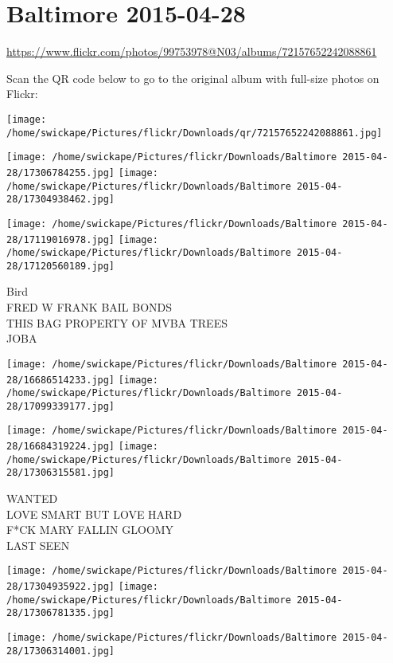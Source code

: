 \documentclass[10pt,letterpaper]{article}
\title{}
\author{}
\date{}
\begin{document}
\section*{Baltimore 2015-04-28}

\url{https://www.flickr.com/photos/99753978@N03/albums/72157652242088861}

Scan the QR code below to go to the original album with full-size photos on Flickr:

\texttt{[image: /home/swickape/Pictures/flickr/Downloads/qr/72157652242088861.jpg]}
\pagebreak

\texttt{[image: /home/swickape/Pictures/flickr/Downloads/Baltimore 2015-04-28/17306784255.jpg]}
\texttt{[image: /home/swickape/Pictures/flickr/Downloads/Baltimore 2015-04-28/17304938462.jpg]}

\texttt{[image: /home/swickape/Pictures/flickr/Downloads/Baltimore 2015-04-28/17119016978.jpg]}
\texttt{[image: /home/swickape/Pictures/flickr/Downloads/Baltimore 2015-04-28/17120560189.jpg]}

Bird\\
FRED W FRANK BAIL BONDS\\
THIS BAG PROPERTY OF MVBA TREES\\
JOBA
\pagebreak

\texttt{[image: /home/swickape/Pictures/flickr/Downloads/Baltimore 2015-04-28/16686514233.jpg]}
\texttt{[image: /home/swickape/Pictures/flickr/Downloads/Baltimore 2015-04-28/17099339177.jpg]}

\texttt{[image: /home/swickape/Pictures/flickr/Downloads/Baltimore 2015-04-28/16684319224.jpg]}
\texttt{[image: /home/swickape/Pictures/flickr/Downloads/Baltimore 2015-04-28/17306315581.jpg]}

WANTED\\
LOVE SMART BUT LOVE HARD\\
F*CK MARY FALLIN GLOOMY\\
LAST SEEN
\pagebreak

\texttt{[image: /home/swickape/Pictures/flickr/Downloads/Baltimore 2015-04-28/17304935922.jpg]}
\texttt{[image: /home/swickape/Pictures/flickr/Downloads/Baltimore 2015-04-28/17306781335.jpg]}

\vspace{0.25in}
\texttt{[image: /home/swickape/Pictures/flickr/Downloads/Baltimore 2015-04-28/17306314001.jpg]}
\end{document}
